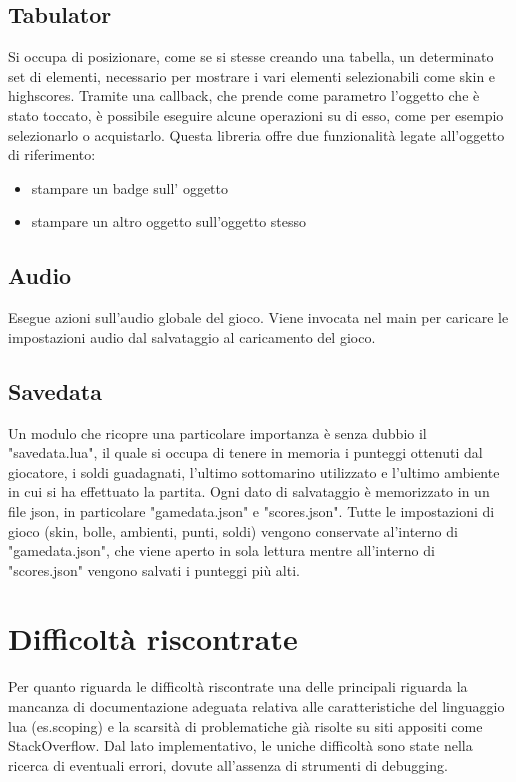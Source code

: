 \documentclass[15pt]{article}
\begin{document}
\subsection{Tabulator} 
Si occupa di posizionare, come se si stesse creando una tabella, un determinato set di elementi, necessario per mostrare i vari elementi selezionabili come skin e highscores. Tramite una callback, che prende come parametro l'oggetto che è stato toccato, è possibile eseguire alcune operazioni su di esso, come per esempio selezionarlo o acquistarlo. Questa libreria offre due funzionalità legate all'oggetto di riferimento:
        \begin{itemize}
            \item stampare un badge sull’ oggetto
            \item stampare un altro oggetto sull'oggetto stesso
        \end{itemize}
\subsection{Audio} 
Esegue azioni sull'audio globale del gioco. Viene invocata nel main per caricare le impostazioni audio dal salvataggio al caricamento del gioco.
\subsection{Savedata}
Un modulo che ricopre una particolare importanza è senza dubbio il "savedata.lua", il quale si occupa di tenere in memoria i punteggi ottenuti dal giocatore, i soldi guadagnati, l'ultimo sottomarino utilizzato e l'ultimo ambiente in cui si ha effettuato la partita. Ogni dato di salvataggio è memorizzato in un file json, in particolare "gamedata.json" e "scores.json". 
Tutte le impostazioni di gioco  (skin, bolle, ambienti, punti, soldi) vengono conservate al'interno di "gamedata.json", che viene aperto in sola lettura mentre all'interno di "scores.json" vengono salvati i punteggi più alti. 

\section{Difficoltà riscontrate}
Per quanto riguarda le difficoltà riscontrate una delle principali riguarda la mancanza di documentazione adeguata relativa alle caratteristiche del linguaggio lua (es.scoping) e la scarsità di problematiche già risolte su siti appositi come StackOverflow. 
Dal lato implementativo, le uniche difficoltà sono state nella ricerca di eventuali errori, dovute all'assenza di strumenti di debugging.
\end{document}
